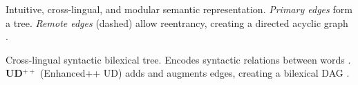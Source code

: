 \documentclass[a0,portrait]{a0poster}
\begin{document}
\begin{multicols}{2}


\color{Black}

\begin{itemize}[labelsep=1em]
{\color{Indigo} \item[\textbf{UCCA}:] Intuitive, cross-lingual, and modular semantic representation.
    \textit{Primary edges} form a tree. \textit{Remote edges} (dashed) allow reentrancy,
    creating a directed acyclic graph \cite{abend2013universal}.}
{\color{DarkBlue} \item[\textbf{UD}:] Cross-lingual syntactic bilexical tree.
    Encodes syntactic relations between words \cite{nivre2016universal}. \\
    \textbf{UD$^{++}$} (Enhanced++ UD) adds and augments edges, creating a bilexical DAG
    \cite{SCHUSTER16.779}.}
\end{itemize}


\end{multicols}
\end{document}
